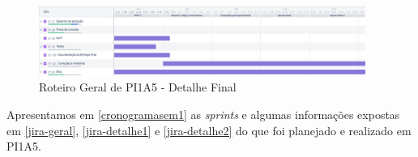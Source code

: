 \begin{figure}[H]
	\centering
	\caption{\label{jira-detalhe2}Roteiro Geral de PI1A5 - Detalhe Final}
	\includegraphics[width=0.95\textwidth]{../imagens/cronograma-detalhe2.png}
\end{figure}

Apresentamos em \autoref{cronogramasem1} as \textit{\glspl{sprint}} e algumas informações expostas em \autoref{jira-geral}, \autoref{jira-detalhe1} e \autoref{jira-detalhe2} do que foi planejado e realizado em PI1A5.

